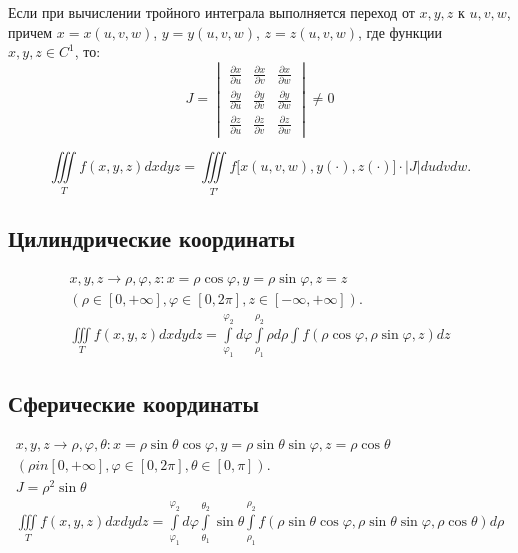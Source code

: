 \documentclass[a4paper,12pt,oneside]{extbook}
\theoremstyle{numbered}
\theoremstyle{unnumbered}
\theoremstyle{named}
\theoremstyle{unnumbered}
\theoremstyle{named}
\theoremstyle{named}
\theoremstyle{named}
\begin{document}
Если при вычислении тройного интеграла выполняется переход от \(x, y, z\) к \(u, v, w\), причем \(x = x(u, v, w)\), \(y = y(u, v, w)\), \(z = z(u, v, w)\), где функции \(x, y, z \in C^1\), то:
\begin{equation}
    J =
    \begin{vmatrix}
        \frac{\partial x}{\partial u} & \frac{\partial x}{\partial v} & \frac{\partial x}{\partial w} \\
        \frac{\partial y}{\partial u} & \frac{\partial y}{\partial v} & \frac{\partial y}{\partial w} \\
        \frac{\partial z}{\partial u} & \frac{\partial z}{\partial v} & \frac{\partial z}{\partial w}
    \end{vmatrix}
    \neq 0
\end{equation}

\begin{equation}
    \iiint\limits_{T} f(x, y, z)dxdyz = \iiint\limits_{T'} f \big[ x(u, v, w), y(\cdot), z(\cdot) \big] \cdot |J| dudvdw.
\end{equation}

\subsection{Цилиндрические координаты}
\label{sub:Цилиндрические координаты}

\begin{equation}
    \begin{gathered}
        x, y, z \to \rho, \varphi, z : x = \rho\cos\varphi, y = \rho\sin\varphi, z = z \\
        (\rho \in [0, +\infty], \varphi \in [0, 2\pi], z \in [-\infty, +\infty]). \\
        \iiint\limits_{T} f(x, y, z)dxdydz = \int\limits_{\varphi_1}^{\varphi_2} d\varphi \int\limits_{\rho_1}^{\rho_2} \rho d\rho \int f(\rho \cos \varphi, \rho \sin \varphi, z) dz
    \end{gathered}
\end{equation}

\subsection{Сферические координаты}
\label{sub:Сферические координаты}

\begin{equation}
    \begin{gathered}
        x, y, z \to \rho, \varphi, \theta : x = \rho \sin \theta \cos \varphi, y = \rho \sin \theta \sin \varphi, z = \rho \cos \theta \\
        (\rho in [0, +\infty], \varphi \in [0, 2\pi], \theta \in [0, \pi]). \\
        J = \rho^2 \sin \theta \\
        \iiint\limits_{T} f(x, y, z) dxdydz = \int\limits_{\varphi_1}^{\varphi_2} d \varphi \int\limits_{\theta_1}^{\theta_2} \sin \theta \int\limits_{\rho_1}^{\rho_2}  f(\rho\sin{\theta\cos\varphi, \rho\sin\theta\sin\varphi,\rho\cos\theta}) d\rho
    \end{gathered}
\end{equation}
\end{document}

